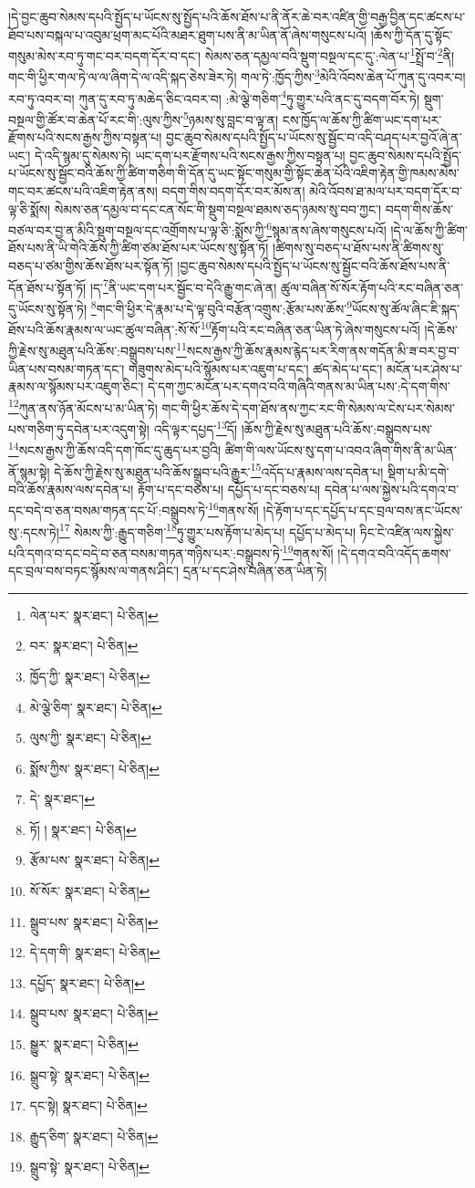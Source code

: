 །དེ་བྱང་ཆུབ་སེམས་དཔའི་སྤྱོད་པ་ཡོངས་སུ་སྤྱོད་པའི་ཆོས་ཐོས་པ་ནི་ནོར་ཆེ་བར་འཛིན་གྱི་བརྒྱ་བྱིན་དང་ཚངས་པ་ཐོབ་པས་བསྐལ་པ་འབུམ་ཕྲག་མང་པོའི་མཐར་ཐུག་པས་ནི་མ་ཡིན་ནོ་ཞེས་གསུངས་པའོ། །ཆོས་ཀྱི་དོན་དུ་སྟོང་གསུམ་མེས་རབ་ཏུ་གང་བར་བདག་དོར་བ་དང་། སེམས་ཅན་དམྱལ་བའི་སྡུག་བསྔལ་དང་དུ་:ལེན་པ་\footnote{ལེན་པར་  སྣར་ཐང་།  པེ་ཅིན། }སྤྲོ་བ་\footnote{བར་  སྣར་ཐང་།  པེ་ཅིན། }ནི། གང་གི་ཕྱིར་གལ་ཏེ་ལ་ལ་ཞིག་དེ་ལ་འདི་སྐད་ཅེས་ཟེར་ཏེ། གལ་ཏེ་:ཁྱོད་ཀྱིས་\footnote{ཁྱོད་ཀྱི་  སྣར་ཐང་།  པེ་ཅིན། }མེའི་འོབས་ཆེན་པོ་ཀུན་དུ་འབར་བ། རབ་ཏུ་འབར་བ། ཀུན་དུ་རབ་ཏུ་མཆེད་ཅིང་འབར་བ། :མེ་ལྕེ་གཅིག་\footnote{མེ་ལྕེ་ཅིག་  སྣར་ཐང་།  པེ་ཅིན། }ཏུ་གྱུར་པའི་ནང་དུ་བདག་བོར་ཏེ། སྡུག་བསྔལ་གྱི་ཚོར་བ་ཆེན་པོ་རང་གི་:ལུས་ཀྱིས་\footnote{ལུས་ཀྱི་  སྣར་ཐང་།  པེ་ཅིན། }ཉམས་སུ་བླང་བ་ལྟ་ན། ངས་ཁྱོད་ལ་ཆོས་ཀྱི་ཚིག་ཡང་དག་པར་རྫོགས་པའི་སངས་རྒྱས་ཀྱིས་བསྟན་པ། བྱང་ཆུབ་སེམས་དཔའི་སྤྱོད་པ་ཡོངས་སུ་སྦྱོང་བ་འདི་བཤད་པར་བྱའོ་ཞེ་ན་ཡང་། དེ་འདི་སྙམ་དུ་སེམས་ཏེ། ཡང་དག་པར་རྫོགས་པའི་སངས་རྒྱས་ཀྱིས་བསྟན་པ། བྱང་ཆུབ་སེམས་དཔའི་སྤྱོད་པ་ཡོངས་སུ་སྦྱོང་བའི་ཆོས་ཀྱི་ཚིག་གཅིག་གི་དོན་དུ་ཡང་སྟོང་གསུམ་གྱི་སྟོང་ཆེན་པོའི་འཇིག་རྟེན་གྱི་ཁམས་མེས་གང་བར་ཚངས་པའི་འཇིག་རྟེན་ནས། བདག་གིས་བདག་དོར་བར་མོས་ན། མེའི་འོབས་ཐ་མལ་པར་བདག་དོར་བ་ལྟ་ཅི་སྨོས། སེམས་ཅན་དམྱལ་བ་དང་ངན་སོང་གི་སྡུག་བསྔལ་ཐམས་ཅད་ཉམས་སུ་བབ་ཀྱང་། བདག་གིས་ཆོས་བཙལ་བར་བྱ་ན་མིའི་སྡུག་བསྔལ་དང་འགྲོགས་པ་ལྟ་ཅི་:སྨོས་ཀྱི་\footnote{སྨོས་ཀྱིས་  སྣར་ཐང་།  པེ་ཅིན། }སྙམ་ནས་ཞེས་གསུངས་པའོ། །དེ་ལ་ཆོས་ཀྱི་ཚིག་ཐོས་པས་ནི་ཡི་གེའི་ཆོས་ཀྱི་ཚིག་ཙམ་ཐོས་པར་ཡོངས་སུ་སྟོན་ཏོ། །ཚིགས་སུ་བཅད་པ་ཐོས་པས་ནི་ཚིགས་སུ་བཅད་པ་ཙམ་གྱིས་ཆོས་ཐོས་པར་སྟོན་ཏོ། །བྱང་ཆུབ་སེམས་དཔའི་སྤྱོད་པ་ཡོངས་སུ་སྦྱོང་བའི་ཆོས་ཐོས་པས་ནི་དོན་ཐོས་པ་སྟོན་ཏོ། །ད་\footnote{དེ་  སྣར་ཐང་། }ནི་ཡང་དག་པར་སྦྱོང་བ་དེའི་རྒྱུ་གང་ཞེ་ན། ཚུལ་བཞིན་སོ་སོར་རྟོག་པའི་རང་བཞིན་ཅན་དུ་ཡོངས་སུ་སྟོན་ཏེ། \footnote{ཏོ། །   སྣར་ཐང་།  པེ་ཅིན། }གང་གི་ཕྱིར་དེ་རྣམ་པ་དེ་ལྟ་བུའི་བརྩོན་འགྲུས་:རྩོམ་པས་ཆོས་\footnote{རྩོམ་པས་  སྣར་ཐང་།  པེ་ཅིན། }ཡོངས་སུ་ཚོལ་ཞིང་ཇི་སྐད་ཐོས་པའི་ཆོས་རྣམས་ལ་ཡང་ཚུལ་བཞིན་:སོ་སོ་\footnote{སོ་སོར་  སྣར་ཐང་།  པེ་ཅིན། }རྟོག་པའི་རང་བཞིན་ཅན་ཡིན་ཏེ་ཞེས་གསུངས་པའོ། །དེ་ཆོས་ཀྱི་རྗེས་སུ་མཐུན་པའི་ཆོས་:བསྒྲུབས་པས་\footnote{སྒྲུབ་པས་  སྣར་ཐང་།  པེ་ཅིན། }སངས་རྒྱས་ཀྱི་ཆོས་རྣམས་རྙེད་པར་རིག་ནས་གདོན་མི་ཟ་བར་བྱ་བ་ཡིན་པས་བསམ་གཏན་དང་། གཟུགས་མེད་པའི་སྙོམས་པར་འཇུག་པ་དང་། ཚད་མེད་པ་དང་། མངོན་པར་ཤེས་པ་རྣམས་ལ་སྙོམས་པར་འཇུག་ཅིང་། དེ་དག་ཀྱང་མངོན་པར་དགའ་བའི་གཞིའི་གནས་མ་ཡིན་པས་:དེ་དག་གིས་\footnote{དེ་དག་གི་  སྣར་ཐང་།  པེ་ཅིན། }ཀུན་ནས་ཉོན་མོངས་པ་མ་ཡིན་ཏེ། གང་གི་ཕྱིར་ཆོས་དེ་དག་ཐོས་ནས་ཀྱང་རང་གི་སེམས་ལ་ངེས་པར་སེམས་པས་གཅིག་ཏུ་དབེན་པར་འདུག་སྟེ། འདི་ལྟར་དཔྱད་\footnote{དཔྱོད་  སྣར་ཐང་།  པེ་ཅིན། }དོ། །ཆོས་ཀྱི་རྗེས་སུ་མཐུན་པའི་ཆོས་:བསྒྲུབས་པས་\footnote{སྒྲུབ་པས་  སྣར་ཐང་།  པེ་ཅིན། }སངས་རྒྱས་ཀྱི་ཆོས་འདི་དག་ཁོང་དུ་ཆུད་པར་བྱའི། ཚིག་གི་ལས་ཡོངས་སུ་དག་པ་འབའ་ཞིག་གིས་ནི་མ་ཡིན་ནོ་སྙམ་སྟེ། དེ་ཆོས་ཀྱི་རྗེས་སུ་མཐུན་པའི་ཆོས་སྒྲུབ་པའི་རྒྱུར་\footnote{སྒྱུར་  སྣར་ཐང་།  པེ་ཅིན། }འདོད་པ་རྣམས་ལས་དབེན་པ། སྡིག་པ་མི་དགེ་བའི་ཆོས་རྣམས་ལས་དབེན་པ། རྟོག་པ་དང་བཅས་པ། དཔྱོད་པ་དང་བཅས་པ། དབེན་པ་ལས་སྐྱེས་པའི་དགའ་བ་དང་བདེ་བ་ཅན་བསམ་གཏན་དང་པོ་:བསྒྲུབས་ཏེ་\footnote{སྒྲུབ་སྟེ་  སྣར་ཐང་།  པེ་ཅིན། }གནས་སོ། །དེ་རྟོག་པ་དང་དཔྱོད་པ་དང་བྲལ་བས་ནང་ཡོངས་སུ་:དངས་ཏེ།\footnote{དང་སྟེ།  སྣར་ཐང་།  པེ་ཅིན། } སེམས་ཀྱི་:རྒྱུད་གཅིག་\footnote{རྒྱུད་ཅིག་  སྣར་ཐང་།  པེ་ཅིན། }ཏུ་གྱུར་པས་རྟོག་པ་མེད་པ། དཔྱོད་པ་མེད་པ། ཏིང་ངེ་འཛིན་ལས་སྐྱེས་པའི་དགའ་བ་དང་བདེ་བ་ཅན་བསམ་གཏན་གཉིས་པར་:བསྒྲུབས་ཏེ་\footnote{སྒྲུབ་སྟེ་  སྣར་ཐང་།  པེ་ཅིན། }གནས་སོ། །དེ་དགའ་བའི་འདོད་ཆགས་དང་བྲལ་བས་བཏང་སྙོམས་ལ་གནས་ཤིང་། དྲན་པ་དང་ཤེས་བཞིན་ཅན་ཡིན་ཏེ། 